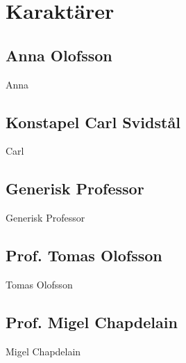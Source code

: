 \section{Karaktärer}
\subsection{Anna Olofsson}
\label{kar:AnnaOlofsson}
Anna
%
\subsection{Konstapel Carl Svidstål}
\label{kar:KonstapelCarlSvidstal}
Carl
%
\subsection{Generisk Professor}
\label{kar:GeneriskProfessor}
Generisk Professor
%
\subsection{Prof. Tomas Olofsson}
\label{kar:TomasOlofsson}
Tomas Olofsson
%
\subsection{Prof. Migel Chapdelain}
\label{kar:MigelChapdelain}
Migel Chapdelain
